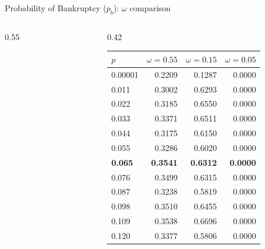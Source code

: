 \documentclass[aspectratio=169,10pt]{beamer}
\begin{document}
\begin{frame}{Probability of Bankruptcy ($p_b$): $\omega$ comparison}
\begin{columns}[T]
\begin{column}{0.55\textwidth}
\begin{figure}
      \end{figure}
    \end{column}
    \begin{column}{0.42\textwidth}
      \footnotesize\renewcommand{\arraystretch}{0.85}\setlength{\tabcolsep}{3pt}
      \begin{tabular}{lrrr}
        \toprule
        $p$ & $\omega=0.55$ & $\omega=0.15$ & $\omega=0.05$ \\
        \midrule
        0.00001 & 0.2209 & 0.1287 & 0.0000 \\
        0.011 & 0.3002 & 0.6293 & 0.0000 \\
        0.022 & 0.3185 & 0.6550 & 0.0000 \\
        0.033 & 0.3371 & 0.6511 & 0.0000 \\
        0.044 & 0.3175 & 0.6150 & 0.0000 \\
        0.055 & 0.3286 & 0.6020 & 0.0000 \\
        \textbf{0.065} & \textbf{0.3541} & \textbf{0.6312} & \textbf{0.0000} \\
        0.076 & 0.3499 & 0.6315 & 0.0000 \\
        0.087 & 0.3238 & 0.5819 & 0.0000 \\
        0.098 & 0.3510 & 0.6455 & 0.0000 \\
        0.109 & 0.3538 & 0.6696 & 0.0000 \\
        0.120 & 0.3377 & 0.5806 & 0.0000 \\
        \bottomrule
      \end{tabular}
    \end{column}
  \end{columns}
\end{frame}
\end{document}
